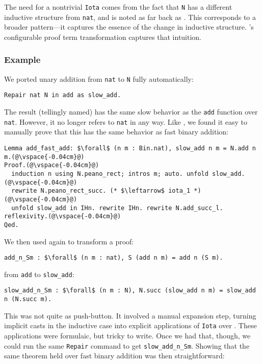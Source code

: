 The need for a nontrivial \lstinline{Iota} comes from the fact that \lstinline{N} has a different
inductive structure from \lstinline{nat}, and is noted as far back as \citet{magaud2000changing}.
This corresponds to a broader pattern---it captures the essence of the change in inductive structure.
\toolname's configurable proof term transformation captures that intuition.

\subsubsection{Example}

We ported unary addition from \lstinline{nat} to \lstinline{N} fully automatically:

\begin{lstlisting}
Repair nat N in add as slow_add.
\end{lstlisting}
The result (tellingly named) has the same slow behavior as the \lstinline{add} function over \lstinline{nat}.
However, it no longer refers to \lstinline{nat} in any way.
Like \citet{magaud2000changing}, we found it easy to manually prove that
this has the same behavior as fast binary addition:

\begin{lstlisting}
Lemma add_fast_add: $\forall$ (n m : Bin.nat), slow_add n m = N.add n m.(@\vspace{-0.04cm}@)
Proof.(@\vspace{-0.04cm}@)
  induction n using N.peano_rect; intros m; auto. unfold slow_add.(@\vspace{-0.04cm}@)
  rewrite N.peano_rect_succ. (* $\leftarrow$ iota_1 *)(@\vspace{-0.04cm}@)
  unfold slow_add in IHn. rewrite IHn. rewrite N.add_succ_l. reflexivity.(@\vspace{-0.04cm}@)
Qed.
\end{lstlisting}

We then used \toolname again to transform a proof:
\begin{lstlisting}
add_n_Sm : $\forall$ (n m : nat), S (add n m) = add n (S m).
\end{lstlisting}
from \lstinline{add} to \lstinline{slow_add}:

\begin{lstlisting}[backgroundcolor=\color{cyan!30}]
slow_add_n_Sm : $\forall$ (n m : N), N.succ (slow_add n m) = slow_add n (N.succ m).
\end{lstlisting}
This was not quite as push-button.
It involved a manual expansion step, turning implicit casts in the inductive case
into explicit applications of \lstinline{Iota} over \A.
These applications were formulaic, but tricky to write.
Once we had that, though, we could run the same \lstinline{Repair} command
to get \lstinline{slow_add_n_Sm}.
Showing that the same theorem held over fast binary addition was then
straightforward:

